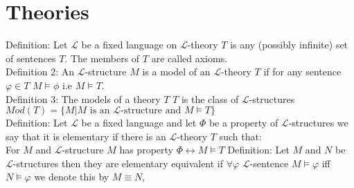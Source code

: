 \documentclass[10pt]{article}
\begin{document}
\section*{Theories}
Definition: Let $\mathcal{L}$ be a fixed language on $\mathcal{L}$-theory $T$ is any (possibly infinite) set of sentences $T$. The members of $T$ are called axioms.\\
Definition 2: An $\mathcal{L}$-structure $M$ is a model of an $\mathcal{L}$-theory $T$ if for any sentence $\varphi\in T$ $M\models \phi$ i.e $M\models T$.\\
Definition 3: The models of a theory $T$ $T$ is the class of $\mathcal{L}$-structures $Mod(T)=\{M|M\text{ is an }\mathcal{L}\text{-structure and }M\models T\}$\\
Definition: Let $\mathcal{L}$ be a fixed language and let $\Phi$ be a property of $\mathcal{L}$-structures we say that it is elementary if there is an $\mathcal{L}$-theory $T$ such that:\\
For $M$ and $\mathcal{L}$-structure $M$ has property $\Phi\leftrightarrow M\models T$ 
Definition: Let $M$ and $N$ be $\mathcal{L}$-structures then they are elementary equivalent if $\forall\varphi$ $\mathcal{L}$-sentence $M\models\varphi$ iff $N\models\varphi$ we denote this by $M\equiv N$,
\end{document}
